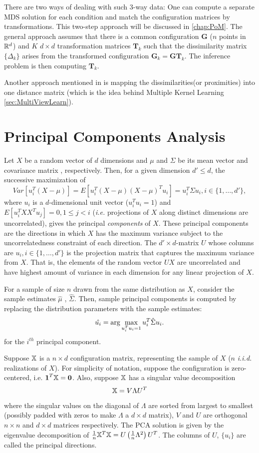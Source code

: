 \documentclass[12pt,oneside,final]{thesis}
\begin{document}
There are two ways of dealing with such 3-way data: One can compute a separate MDS solution for  each condition and match the configuration matrices by transformations. This two-step approach will be discussed in \autoref{chap:PoM}. The general approach assumes that there is a common configuration $\mathbf{G}$ ($n$ points in $\mathbb{R}^{d}$) and $K$ $d \times d$ transformation matrices ${\mathbf{T}_k}$ such that the dissimilarity matrix $\{\Delta_k\}$ arises  from the transformed configuration $\mathbf{G}_k =\mathbf{G}\mathbf{T}_k$. The inference problem is then computing $\mathbf{T}_k$.

Another approach mentioned in \cite{borg+groenen:1997} is  mapping the dissimilarities(or proximities) into one distance matrix (which is the idea behind Multiple Kernel Learning \ref{sec:MultiViewLearn}).


\section{Principal Components Analysis}
Let $X$ be a random vector of   $d$ dimensions and $\mu$ and $\Sigma$ be its mean vector and covariance matrix , respectively. Then, for a given dimension $d'\leq d$, the successive maximization of  $$Var[u_{i}^T (X-\mu)]= E[u_{i}^T (X-\mu)(X-\mu)^T u_i]=u_{i}^T\Sigma u_{i},  i \in \{1,\ldots,d'\},$$ where $u_{i}$ is a  $d$-dimensional unit vector ($u_i^Tu_i=1$)  and $E[u_{i}^T X X^T u_j]=0 , 1\leq j<i$ (\textit{i.e.} projections of $X$ along distinct dimensions are uncorrelated), gives the principal \emph{components} of $X$. These principal components are the directions in which $X$ has the maximum variance subject to the uncorrelatedness constraint of each direction. The $d' \times d$-matrix $U$ whose columns are $u_i, i \in \{1,\ldots,d'\}$  is the projection matrix that captures the maximum variance from $X$. That is, the elements of the random vector $UX$ are uncorrelated and have highest amount of variance in each dimension for any linear projection of $X$.

For a sample of size $n$ drawn from the same distribution as $X$, consider the sample estimates $\hat{\mu}$ ,  $\hat{\Sigma} $. Then, sample principal components  is computed by replacing the distribution parameters with the sample estimates:
 \[\hat{u_i}=\arg\max_{u_i^Tu_i=1} u_{i}^T \hat{\Sigma}u_i. \]
for the $i^{th}$ principal component.

Suppose $\mathbb{X}$ is a $n \times d$ configuration matrix, representing the sample of $X$ ($n$ \textit{i.i.d.} realizations of $X$). For simplicity of notation, suppose the configuration is zero-centered, i.e. $\mbox{{\bf 1}} ^T \mathbb{X}  = \bm{0}$. Also, suppose $\mathbb{X}$ has a singular value decomposition $$\mathbb{X}= V\Lambda U^T$$ where the singular values on the diagonal of $\Lambda$ are sorted from largest to smallest (possibly padded with zeros to make $\Lambda$  a $d \times d$ matrix), $V$ and $U$ are orthogonal $n \times n$ and $d \times d$ matrices respectively. The PCA solution is  given by the eigenvalue decomposition of 
$\frac{1}{n} {\mathbb{X}}^T \mathbb{X}=U \left( \frac{1}{n} \Lambda^2 \right) U^T$. The columns of $U$, $\{ u_i \}$ are called the principal directions. 
\end{document}
